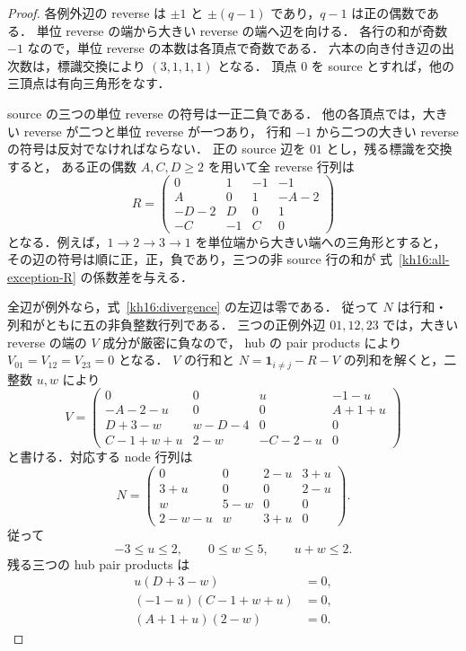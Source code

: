 \begin{proof}
各例外辺の reverse は $\pm1$ と $\pm(q-1)$ であり，$q-1$ は正の偶数である．
単位 reverse の端から大きい reverse の端へ辺を向ける．
各行の和が奇数 $-1$ なので，単位 reverse の本数は各頂点で奇数である．
六本の向き付き辺の出次数は，標識交換により $(3,1,1,1)$ となる．
頂点 $0$ を source とすれば，他の三頂点は有向三角形をなす．

source の三つの単位 reverse の符号は一正二負である．
他の各頂点では，大きい reverse が二つと単位 reverse が一つあり，
行和 $-1$ から二つの大きい reverse の符号は反対でなければならない．
正の source 辺を $01$ とし，残る標識を交換すると，
ある正の偶数 $A,C,D\geq2$ を用いて全 reverse 行列は
\begin{equation}\label{kh16:all-exception-R}
 R=\begin{pmatrix}
 0&1&-1&-1\\
 A&0&1&-A-2\\
 -D-2&D&0&1\\
 -C&-1&C&0
 \end{pmatrix}
\end{equation}
となる．例えば，$1\to2\to3\to1$ を単位端から大きい端への三角形とすると，
その辺の符号は順に正，正，負であり，三つの非 source 行の和が
式~\eqref{kh16:all-exception-R} の係数差を与える．

全辺が例外なら，式~\eqref{kh16:divergence} の左辺は零である．
従って $N$ は行和・列和がともに五の非負整数行列である．
三つの正例外辺 $01,12,23$ では，大きい reverse の端の $V$ 成分が厳密に負なので，
hub の pair products により $V_{01}=V_{12}=V_{23}=0$ となる．
$V$ の行和と $N=\boldsymbol{1}_{i\ne j}-R-V$ の列和を解くと，二整数 $u,w$ により
\begin{equation}\label{kh16:all-exception-V}
 V=\begin{pmatrix}
 0&0&u&-1-u\\
 -A-2-u&0&0&A+1+u\\
 D+3-w&w-D-4&0&0\\
 C-1+w+u&2-w&-C-2-u&0
 \end{pmatrix}
\end{equation}
と書ける．対応する node 行列は
\begin{equation}\label{kh16:all-exception-N}
 N=\begin{pmatrix}
 0&0&2-u&3+u\\
 3+u&0&0&2-u\\
 w&5-w&0&0\\
 2-w-u&w&3+u&0
 \end{pmatrix}.
\end{equation}
従って
\begin{equation}\label{kh16:uw-range}
 -3\leq u\leq2,\qquad0\leq w\leq5,\qquad u+w\leq2.
\end{equation}
残る三つの hub pair products は
\begin{equation}\label{kh16:three-products}
 \begin{split}
 u(D+3-w)&=0,\\
 (-1-u)(C-1+w+u)&=0,\\
 (A+1+u)(2-w)&=0.
 \end{split}
\end{equation}


\end{proof}
